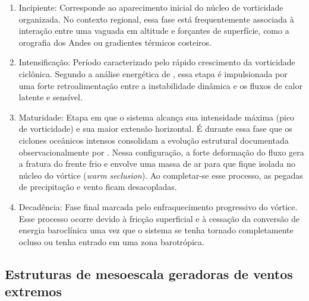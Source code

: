 \begin{enumerate}
    \item Incipiente: Corresponde ao aparecimento inicial do núcleo de vorticidade organizada. No contexto regional, essa fase está frequentemente associada à interação entre uma vaguada em altitude e forçantes de superfície, como a orografia dos Andes ou gradientes térmicos costeiros.    
    
    \item Intensificação: Período caracterizado pelo rápido crescimento da vorticidade ciclônica. Segundo a análise energética de \citet{coutodesouza2024thesis}, essa etapa é impulsionada por uma forte retroalimentação entre a instabilidade dinâmica e os fluxos de calor latente e sensível.
    
    \item Maturidade: Etapa em que o sistema alcança sua intensidade máxima (pico de vorticidade) e sua maior extensão horizontal. É durante essa fase que os ciclones oceânicos intensos consolidam a evolução estrutural documentada observacionalmente por \citet{shapiro1999bridge}. Nessa configuração, a forte deformação do fluxo gera a fratura do frente frio e envolve uma massa de ar para que fique isolada no núcleo do vórtice (\textit{warm seclusion}). Ao completar-se esse processo, as pegadas de precipitação e vento ficam desacopladas.
    
    \item Decadência: Fase final marcada pelo enfraquecimento progressivo do vórtice. Esse processo ocorre devido à fricção superficial e à cessação da conversão de energia baroclínica uma vez que o sistema se tenha tornado completamente ocluso ou tenha entrado em uma zona barotrópica.
\end{enumerate}


\subsection{Estruturas de mesoescala geradoras de ventos extremos}\label{subsec:tb_mesoescala}

